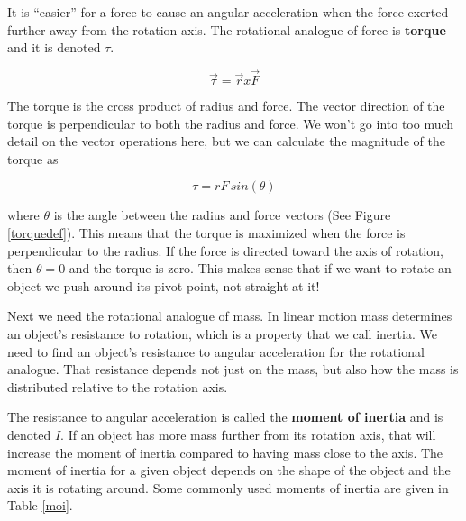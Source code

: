 \documentclass[12pt]{book}
\begin{document}
It is ``easier'' for a force to cause an angular acceleration when the force exerted further away from the rotation axis. The rotational analogue of force is \textbf{torque} and it is denoted $\tau$.

\begin{equation}
\overrightarrow{\tau} = \overrightarrow{r} x \overrightarrow{F} 
\end{equation}

The torque is the cross product of radius and force. The vector direction of the torque is perpendicular to both the radius and force. We won't go into too much detail on the vector operations here, but we can calculate the magnitude of the torque as

\begin{equation}
\tau = rF \, sin(\theta)
\end{equation}

where $\theta$ is the angle between the radius and force vectors (See Figure \ref{torquedef}). This means that the torque is maximized when the force is perpendicular to the radius. If the force is directed toward the axis of rotation, then $\theta = 0$ and the torque is zero. This makes sense that if we want to rotate an object we push around its pivot point, not straight at it!

Next we need the rotational analogue of mass. In linear motion mass determines an object's resistance to rotation, which is a property that we call inertia. We need to find an object's resistance to angular acceleration for the rotational analogue. That resistance depends not just on the mass, but also how the mass is distributed relative to the rotation axis. 

The resistance to angular acceleration is called the \textbf{moment of inertia} and is denoted $I$. If an object has more mass further from its rotation axis, that will increase the moment of inertia compared to having mass close to the axis. The moment of inertia for a given object depends on the shape of the object and the axis it is rotating around. Some commonly used moments of inertia are given in Table \ref{moi}.
\end{document}
